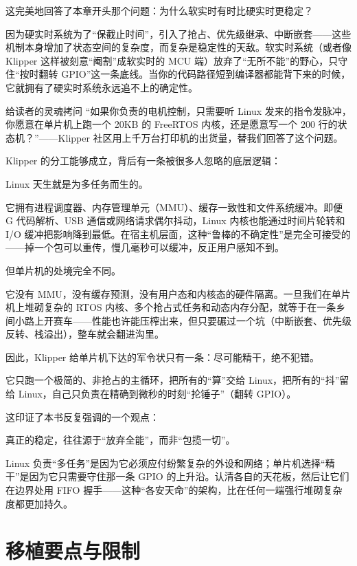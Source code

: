 这完美地回答了本章开头那个问题：为什么软实时有时比硬实时更稳定？

因为硬实时系统为了“保截止时间”，引入了抢占、优先级继承、中断嵌套——这些机制本身增加了状态空间的复杂度，而复杂是稳定性的天敌。软实时系统（或者像 Klipper 这样被刻意“阉割”成软实时的 MCU 端）放弃了“无所不能”的野心，只守住“按时翻转 GPIO”这一条底线。当你的代码路径短到编译器都能背下来的时候，它就拥有了硬实时系统永远追不上的确定性。

\begin{anybox}{给读者的灵魂拷问}
“如果你负责的电机控制，只需要听 Linux 发来的指令发脉冲，你愿意在单片机上跑一个 20KB 的 FreeRTOS 内核，还是愿意写一个 200 行的状态机？”——Klipper 社区用上千万台打印机的出货量，替我们回答了这个问题。
\end{anybox}

Klipper 的分工能够成立，背后有一条被很多人忽略的底层逻辑：

Linux 天生就是为多任务而生的。

它拥有进程调度器、内存管理单元（MMU）、缓存一致性和文件系统缓冲。即便 G 代码解析、USB 通信或网络请求偶尔抖动，Linux 内核也能通过时间片轮转和 I/O 缓冲把影响降到最低。在宿主机层面，这种“鲁棒的不确定性”是完全可接受的——掉一个包可以重传，慢几毫秒可以缓冲，反正用户感知不到。

但单片机的处境完全不同。

它没有 MMU，没有缓存预测，没有用户态和内核态的硬件隔离。一旦我们在单片机上堆砌复杂的 RTOS 内核、多个抢占式任务和动态内存分配，就等于在一条乡间小路上开赛车——性能也许能压榨出来，但只要碾过一个坑（中断嵌套、优先级反转、栈溢出），整车就会翻进沟里。

因此，Klipper 给单片机下达的军令状只有一条：尽可能精干，绝不犯错。

它只跑一个极简的、非抢占的主循环，把所有的“算”交给 Linux，把所有的“抖”留给 Linux，自己只负责在精确到微秒的时刻“抡锤子”（翻转 GPIO）。

这印证了本书反复强调的一个观点：

真正的稳定，往往源于“放弃全能”，而非“包揽一切”。

Linux 负责“多任务”是因为它必须应付纷繁复杂的外设和网络；单片机选择“精干”是因为它只需要守住那一条 GPIO 的上升沿。认清各自的天花板，然后让它们在边界处用 FIFO 握手——这种“各安天命”的架构，比在任何一端强行堆砌复杂度都更加持久。

\section{移植要点与限制}

